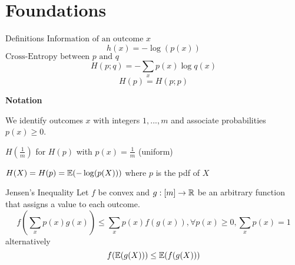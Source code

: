 \section{Foundations}
\begin{mainbox}{Definitions}
    \(\text{Information of an outcome }x\)
    \[h(x) = - \log(p(x))\]
    \(\text{Cross-Entropy between }p \text{ and }q\)
    \[H(p; q) = - \sum_{x}p(x) \log q(x)\]
    \[H(p) = H(p; p) \]
\end{mainbox}    
\textbf{Notation} 

We identify outcomes \(x\) with integers \(1, ..., m\) and associate probabilities \(p(x) \geq 0\).

\(H(\frac{1}{m})\) for \(H(p)\) with \(p(x) = \frac{1}{m}\) (uniform)

\(H(X) = H(p) = \mathbb{E}(-\log(p(X)))\) where \(p\) is the pdf of \(X\)


\begin{subbox}{Jensen's Inequality}
    Let \(f\) be convex and \(g: [m] \to \mathbb{R}\) be an arbitrary function that assigns a value to each outcome.
    \[f\left(\sum_{x}p(x)g(x)\right) \leq \sum_{x} p(x) f(g(x)), \forall p(x) \geq 0, \sum_x p(x) = 1\]
    alternatively
    \[f(\mathbb{E}(g(X))) \leq \mathbb{E}(f(g(X)))\]
\end{subbox}

